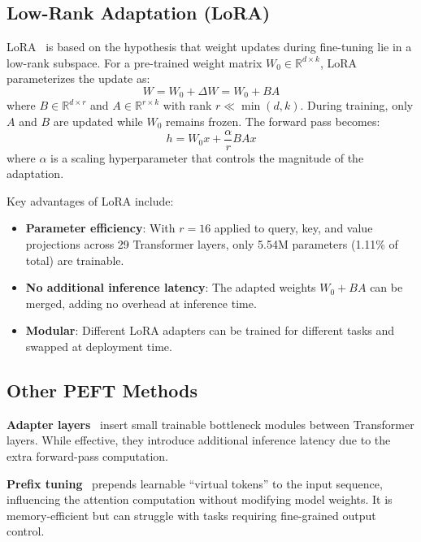 \subsection{Low-Rank Adaptation (LoRA)}

LoRA~\cite{Hu2022} is based on the hypothesis that weight updates during fine-tuning lie in a low-rank subspace. For a pre-trained weight matrix $W_0 \in \mathbb{R}^{d \times k}$, LoRA parameterizes the update as:
\begin{equation}
    W = W_0 + \Delta W = W_0 + BA
    \label{eq:lora}
\end{equation}
where $B \in \mathbb{R}^{d \times r}$ and $A \in \mathbb{R}^{r \times k}$ with rank $r \ll \min(d, k)$. During training, only $A$ and $B$ are updated while $W_0$ remains frozen. The forward pass becomes:
\begin{equation}
    h = W_0 x + \frac{\alpha}{r} B A x
\end{equation}
where $\alpha$ is a scaling hyperparameter that controls the magnitude of the adaptation.

Key advantages of LoRA include:
\begin{itemize}
    \item \textbf{Parameter efficiency}: With $r=16$ applied to query, key, and value projections across 29 Transformer layers, only 5.54M parameters (1.11\% of total) are trainable.
    \item \textbf{No additional inference latency}: The adapted weights $W_0 + BA$ can be merged, adding no overhead at inference time.
    \item \textbf{Modular}: Different LoRA adapters can be trained for different tasks and swapped at deployment time.
\end{itemize}

\subsection{Other PEFT Methods}

\textbf{Adapter layers}~\cite{Houlsby2019} insert small trainable bottleneck modules between Transformer layers. While effective, they introduce additional inference latency due to the extra forward-pass computation.

\textbf{Prefix tuning}~\cite{Li2021} prepends learnable ``virtual tokens'' to the input sequence, influencing the attention computation without modifying model weights. It is memory-efficient but can struggle with tasks requiring fine-grained output control.

